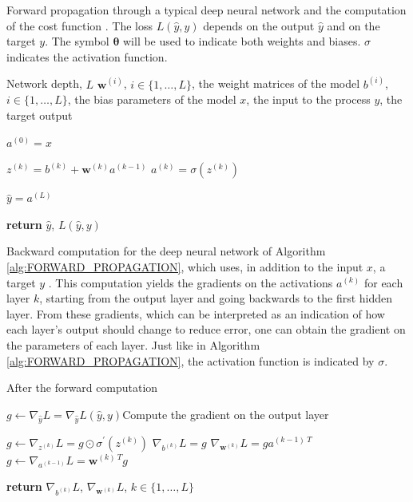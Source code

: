 \begin{algorithm}[H]
\caption{Forward propagation through a typical deep neural network and the computation of the cost function \cite{deeplearningbook}. The loss $L(\hat{y},y)$ depends on the output $\hat{y}$ and on the target $y$. The symbol $\bm{\theta}$ will be used to indicate both weights and biases. $\sigma$ indicates the activation function.}\label{alg:FORWARD_PROPAGATION}
\begin{algorithmic}[1]
\Require Network depth, $L$
\Require $\mathbf{w}^{(i)}$, $i \in \{1,\dots,L\}$, the weight matrices of the model
\Require $b^{(i)}$, $i \in \{1,\dots,L\}$, the bias parameters of the model
\Require $x$, the input to the process
\Require $y$, the target output


\State $a^{(0)} = x$

\State $z^{(k)} = b^{(k)} + \mathbf{w}^{(k)} a^{(k-1)}$
\State $a^{(k)} = \sigma(z^{(k)})$
\EndFor

\State $\hat{y} = a^{(L)}$

\State \textbf{return} $\hat{y}$, $L(\hat{y},y)$
\EndProcedure
\end{algorithmic}
\end{algorithm}


\begin{algorithm}[H]
\caption{Backward computation for the deep neural network of Algorithm \ref{alg:FORWARD_PROPAGATION}, which uses, in addition to the input $x$, a target $y$ \cite{deeplearningbook}. This computation yields the gradients on the activations $a^{(k)}$ for each layer $k$, starting from the output layer and going backwards to the first hidden layer. From these gradients, which can be interpreted as an indication of how each layer's output should change to reduce error, one can obtain the gradient on the parameters of each layer. Just like in Algorithm \ref{alg:FORWARD_PROPAGATION}, the activation function is indicated by $\sigma$.}\label{alg:BACKWARD_COMPUTATION}
\begin{algorithmic}[1]
 \Comment After the forward computation

\State $g \gets \nabla_{\hat{y}}L = \nabla_{\hat{y}}L(\hat{y},y)$\Comment Compute the gradient on the output layer

\State $g \gets \nabla_{z^{(k)}}L = g \odot \sigma^{\prime}(z^{(k)})$
\State $\nabla_{b^{(k)}}L = g$
\State $\nabla_{\mathbf{w}^{(k)}}L = g a^{(k-1)~T}$
\State $g \gets \nabla_{a^{(k-1)}}L = \mathbf{w}^{(k)~T} g$
\EndFor

\State \textbf{return} $\nabla_{b^{(k)}}L$, $\nabla_{\mathbf{w}^{(k)}}L$, $k \in \{1,\dots,L\}$
\EndProcedure
\end{algorithmic}
\end{algorithm}





